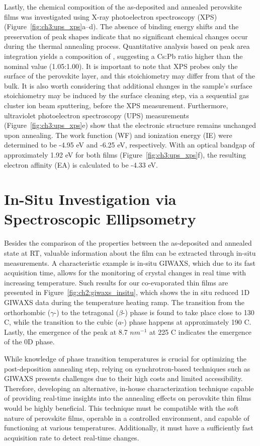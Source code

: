 Lastly, the chemical composition of the as-deposited and annealed perovskite films was investigated using X-ray photoelectron spectroscopy (XPS) (Figure~\ref{fig:ch3:ups_xps}a–d). The absence of binding energy shifts and the preservation of peak shapes indicate that no significant chemical changes occur during the thermal annealing process. Quantitative analysis based on peak area integration yields a composition of , suggesting a Cs:Pb ratio higher than the nominal value (1.05:1.00). It is important to note that XPS probes only the surface of the perovskite layer, and this stoichiometry may differ from that of the bulk. It is also worth considering that additional changes in the sample's surface stoichiometry may be induced by the surface cleaning step, via a sequential gas cluster ion beam sputtering, before the XPS measurement. Furthermore, ultraviolet photoelectron spectroscopy (UPS) measurements (Figure~\ref{fig:ch3:ups_xps}e) show that the electronic structure remains unchanged upon annealing. The work function (WF) and ionization energy (IE) were determined to be -4.95 eV and -6.25 eV, respectively. With an optical bandgap of approximately 1.92 eV for both films (Figure~\ref{fig:ch3:ups_xps}f), the resulting electron affinity (EA) is calculated to be -4.33 eV.

\section{In-Situ Investigation via Spectroscopic Ellipsometry} \label{sec:in_situ}

Besides the comparison of the properties between the as-deposited and annealed state at RT, valuable information about the film can be extracted through in-situ measurements. A characteristic example is in-situ GIWAXS, which due to its fast acquisition time, allows for the monitoring of crystal changes in real time with increasing temperature. Such results for our co-evaporated  thin films are presented in Figure~\ref{fig:ch2:giwaxs_insitu}, which shows the in situ reduced 1D GIWAXS data during the temperature heating ramp. The transition from the orthorhombic ($\gamma$-) to the tetragonal ($\beta$-) phase is found to take place close to 130 \degree C, while the transition to the cubic ($a$-) phase happens at approximately 190 \degree C. Lastly, the emergence of the peak at 8.7 $nm^{-1}$ at 225 \degree C indicates the emergence of the 0D  phase. 


While knowledge of phase transition temperatures is crucial for optimizing the post-deposition annealing step, relying on synchrotron-based techniques such as GIWAXS presents challenges due to their high costs and limited accessibility. Therefore, developing an alternative, in-house characterization technique capable of providing real-time insights into the annealing effects on perovskite thin films would be highly beneficial. This technique must be compatible with the soft nature of perovskite films, operable in a controlled environment, and capable of functioning at various temperatures. Additionally, it must have a sufficiently fast acquisition rate to detect real-time changes.

